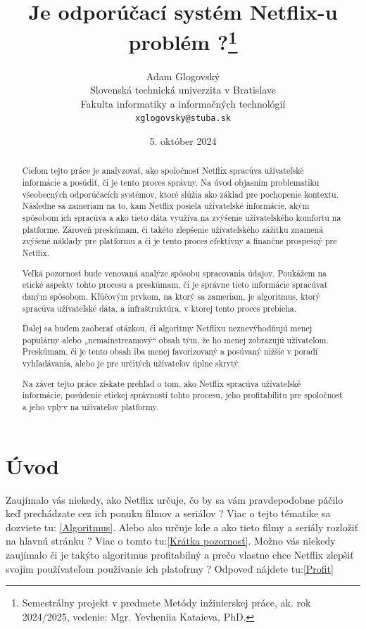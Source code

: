 \documentclass[10pt,twoside,slovak,a4paper]{article}
\title{Je odporúčací systém Netflix-u problém ?\thanks{Semestrálny projekt v predmete Metódy inžinierskej práce, ak. rok 2024/2025, vedenie: Mgr. Yevheniia Kataieva, PhD.}}
\author{Adam Glogovský\\[2pt]
	{\small Slovenská technická univerzita v Bratislave}\\
	{\small Fakulta informatiky a informačných technológií}\\
	{\small \texttt{xglogovsky@stuba.sk}}}
\date{\small 5. október 2024}
\begin{document}
\maketitle
\begin{abstract}
	Cieľom tejto práce je analyzovať, ako spoločnosť Netflix spracúva užívateľské informácie a posúdiť, či je tento proces správny. Na úvod objasním problematiku všeobecných odporúčacích systémov, ktoré slúžia ako základ pre pochopenie kontextu. Následne sa zameriam na to, kam Netflix posiela užívateľské informácie, akým spôsobom ich spracúva a ako tieto dáta využíva na zvýšenie užívateľského komfortu na platforme. Zároveň preskúmam, či takéto zlepšenie užívateľského zážitku znamená zvýšené náklady pre platformu a či je tento proces efektívny a finančne prospešný pre Netflix.

	Veľká pozornosť bude venovaná analýze spôsobu spracovania údajov. Poukážem na etické aspekty tohto procesu a preskúmam, či je správne tieto informácie spracúvať daným spôsobom. Kľúčovým prvkom, na ktorý sa zameriam, je algoritmus, ktorý spracúva užívateľské dáta, a infraštruktúra, v ktorej tento proces prebieha.\cite{amatriain2015recommender}

	Ďalej sa budem zaoberať otázkou, či algoritmy Netflixu neznevýhodňujú menej populárny alebo „nemainstreamový“ obsah tým, že ho menej zobrazujú užívateľom. Preskúmam, či je tento obsah iba menej favorizovaný a posúvaný nižšie v poradí vyhľadávania, alebo je pre určitých užívateľov úplne skrytý.

	Na záver tejto práce získate prehľad o tom, ako Netflix spracúva užívateľské informácie, posúdenie etickej správnosti tohto procesu, jeho profitabilitu pre spoločnosť a jeho vplyv na užívateľov platformy.\cite{OpenAI_ChatGPT}
\end{abstract}

\section*{Úvod}
Zaujímalo vás niekedy, ako Netflix určuje, čo by sa vám pravdepodobne páčilo keď prechádzate cez ich ponuku filmov a seriálov ? Viac o tejto tématike sa dozviete tu: \ref{Algoritmus}. Alebo ako určuje kde a ako tieto filmy a seriály rozložiť na hlavnú stránku ? Viac o tomto tu:\ref{Krátka pozornosť}. Možno vás niekedy zaujímalo či je takýto algoritmus profitabilný a prečo vlastne chce Netflix zlepšiť svojim používateľom používanie ich platofrmy ? Odpoveď nájdete tu:\ref{Profit}

\newpage
\end{document}
